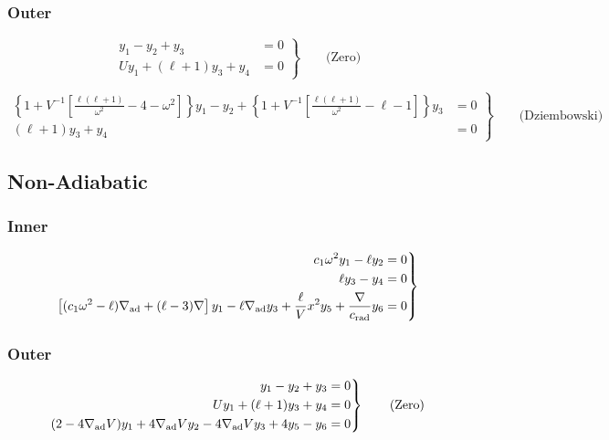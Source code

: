 \documentclass{article}
\newcommand{\nabad}{\ensuremath{\nabla_{\rm ad}}}
\newcommand{\crad}{\ensuremath{c_{\rm rad}}}
\begin{document}
\subsubsection*{Outer}

\begin{equation*}
\left.
\begin{aligned}
y_{1} - y_{2} + y_{3} &= 0 \\
U y_{1} + (\ell + 1) y_{3} + y_{4} &= 0
\end{aligned}
\right\} \qquad \text{(Zero)}
\end{equation*}

\begin{equation*}
\left.
\begin{aligned}
\left\{ 1 + V^{-1} \left[ \frac{\ell(\ell+1)}{\omega^{2}} - 4 - \omega^{2} \right] \right\} y_{1} -
y_{2} +
\left\{ 1 + V^{-1} \left[ \frac{\ell(\ell+1)}{\omega^{2}} - \ell - 1 \right] \right\} y_{3} &= 0 \\
(\ell + 1) y_{3} + y_{4} &= 0
\end{aligned}
\right\} \qquad \text{(Dziembowski)}
\end{equation*}

\subsection*{Non-Adiabatic}

\subsubsection*{Inner}

\begin{equation*}
\left.
\begin{aligned}
c_{1} \omega^{2} y_{1} - \ell y_{2} &= 0 \\
\ell y_{3} - y_{4} &= 0 \\
\left[ (c_{1} \omega^{2} - \ell) \nabad + (\ell-3) \nabla \right] y_{1} -
\ell \nabad y_{3} + \frac{\ell}{V} x^{2} y_{5} + \frac{\nabla}{\crad} y_{6} &= 0
\end{aligned}
\right\}
\end{equation*}

\subsubsection*{Outer}

\begin{equation*}
\left.
\begin{aligned}
y_{1} - y_{2} + y_{3} &= 0 \\
U y_{1} + (\ell + 1) y_{3} + y_{4} &= 0 \\
(2 - 4\nabad V) y_{1} + 4 \nabad V y_{2} - 4 \nabad V y_{3} + 4 y_{5} - y_{6} &= 0
\end{aligned}
\right\} \qquad \text{(Zero)}
\end{equation*}
\end{document}
